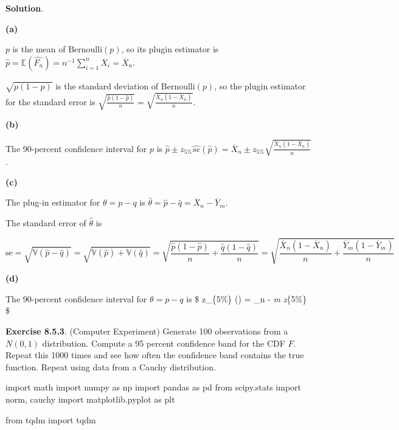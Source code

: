 \textbf{Solution}.

\textbf{(a)}

\(p\) is the mean of \(\text{Bernoulli}(p)\), so its plugin estimator is
\(\hat{p} = \mathbb{E}(\hat{F_n}) = n^{-1} \sum_{i=1}^n X_i  = \overline{X}_n\).

\(\sqrt{p(1-p)}\) is the standard deviation of \(\text{Bernoulli}(p)\),
so the plugin estimator for the standard error is
\(\sqrt{\frac{\hat{p}(1-\hat{p})}{n}} = \sqrt{\frac{\overline{X}_n(1 - \overline{X}_n)}{n}}\).

\textbf{(b)}

The 90-percent confidence interval for \(p\) is
\(\hat{p} \pm z_{5\%} \hat{se}(\hat{p})= \overline{X}_n \pm z_{5\%} \sqrt{\frac{\overline{X}_n(1-\overline{X}_n)}{n}}\).

\textbf{(c)}

The plug-in estimator for \(\theta = p - q\) is
\(\hat{\theta} = \hat{p} - \hat{q} = \overline{X}_n - \overline{Y}_m\).

The standard error of \(\hat{\theta}\) is

\[\text{se} = \sqrt{\mathbb{V}(\hat{p} - \hat{q})} = \sqrt{\mathbb{V}(\hat{p}) + \mathbb{V}(\hat{q})} = \sqrt{\frac{\hat{p}(1 - \hat{p})}{n} + \frac{\hat{q}(1 - \hat{q})}{n}} = \sqrt{\frac{\overline{X}_n(1 - \overline{X}_n)}{n} + \frac{\overline{Y}_m(1 - \overline{Y}_m)}{n}} \]

\textbf{(d)}

The 90-percent confidence interval for \(\theta = p - q\) is
\$\hat{\theta} \pm z\_\{5\%\} (\hat{\theta}) = \_n -
\emph{m \pm z}\{5\%\}
\$

\textbf{Exercise 8.5.3}. (Computer Experiment) Generate 100 observations
from a \(N(0, 1)\) distribution. Compute a 95 percent confidence band
for the CDF \(F\). Repeat this 1000 times and see how often the
confidence band contains the true function. Repeat using data from a
Cauchy distribution.

\begin{python}
import math
import numpy as np
import pandas as pd
from scipy.stats import norm, cauchy
import matplotlib.pyplot as plt

from tqdm import tqdm
\end{python}

